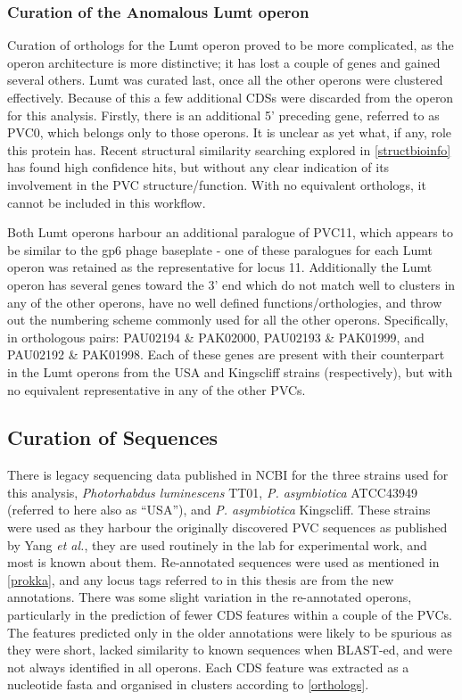 \subsubsection{Curation of the Anomalous Lumt operon}\label{anomalouslumt}
Curation of orthologs for the Lumt operon proved to be more complicated, as the operon architecture is more distinctive; it has lost a couple of genes and gained several others. Lumt was curated last, once all the other operons were clustered effectively. Because of this a few additional CDSs were discarded from the operon for this analysis. Firstly, there is an additional 5' preceding gene, referred to as PVC0, which belongs only to those operons. It is unclear as yet what, if any, role this protein has. Recent structural similarity searching explored in \vref{structbioinfo} has found high confidence hits, but without any clear indication of its involvement in the PVC structure/function. With no equivalent orthologs, it cannot be included in this workflow.

Both Lumt operons harbour an additional paralogue of PVC11, which appears to be similar to the gp6 phage baseplate - one of these paralogues for each Lumt operon was retained as the representative for locus 11. Additionally the Lumt operon has several genes toward the 3' end which do not match well to clusters in any of the other operons, have no well defined functions/orthologies, and throw out the numbering scheme commonly used for all the other operons. Specifically, in orthologous pairs: PAU02194 \& PAK02000, PAU02193 \& PAK01999, and PAU02192 \& PAK01998. Each of these genes are present with their counterpart in the Lumt operons from the USA and Kingscliff strains (respectively), but with no equivalent representative in any of the other PVCs.


\subsection{Curation of Sequences}
	There is legacy sequencing data published in NCBI for the three strains used for this analysis, \emph{Photorhabdus luminescens} TT01, \emph{P. asymbiotica} ATCC43949 (referred to here also as ``USA''), and \emph{P. asymbiotica} Kingscliff. These strains were used as they harbour the originally discovered PVC sequences as published by Yang \emph{et al.}\citep{Yang2006}, they are used routinely in the lab for experimental work, and most is known about them. Re-annotated sequences were used as mentioned in \vref{prokka}, and any locus tags referred to in this thesis are from the new annotations. There was some slight variation in the re-annotated operons, particularly in the prediction of fewer CDS features within a couple of the PVCs. The features predicted only in the older annotations were likely to be spurious as they were short, lacked similarity to known sequences when BLAST-ed, and were not always identified in all operons. Each CDS feature was extracted as a nucleotide fasta and organised in clusters according to \vref{orthologs}. 
	
